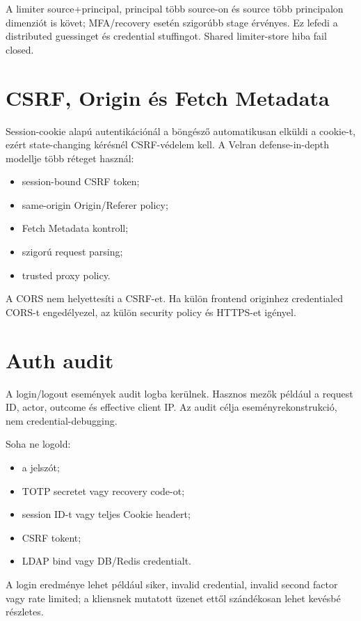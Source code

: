 A limiter source+principal, principal több source-on és source több principalon dimenziót is követ; MFA/recovery esetén szigorúbb stage érvényes. Ez lefedi a distributed guessinget és credential stuffingot. Shared limiter-store hiba fail closed.

\section{CSRF, Origin és Fetch Metadata}

Session-cookie alapú autentikációnál a böngésző automatikusan elküldi a cookie-t, ezért state-changing kérésnél CSRF-védelem kell. A Velran defense-in-depth modellje több réteget használ:

\begin{itemize}
  \item session-bound CSRF token;
  \item same-origin Origin/Referer policy;
  \item Fetch Metadata kontroll;
  \item szigorú request parsing;
  \item trusted proxy policy.
\end{itemize}

A CORS nem helyettesíti a CSRF-et. Ha külön frontend originhez credentialed CORS-t engedélyezel, az külön security policy és HTTPS-et igényel.

\section{Auth audit}

A login/logout események audit logba kerülnek. Hasznos mezők például a request ID, actor, outcome és effective client IP. Az audit célja eseményrekonstrukció, nem credential-debugging.

Soha ne logold:

\begin{itemize}
  \item a jelszót;
  \item TOTP secretet vagy recovery code-ot;
  \item session ID-t vagy teljes Cookie headert;
  \item CSRF tokent;
  \item LDAP bind vagy DB/Redis credentialt.
\end{itemize}

A login eredménye lehet például siker, invalid credential, invalid second factor vagy rate limited; a kliensnek mutatott üzenet ettől szándékosan lehet kevésbé részletes.

